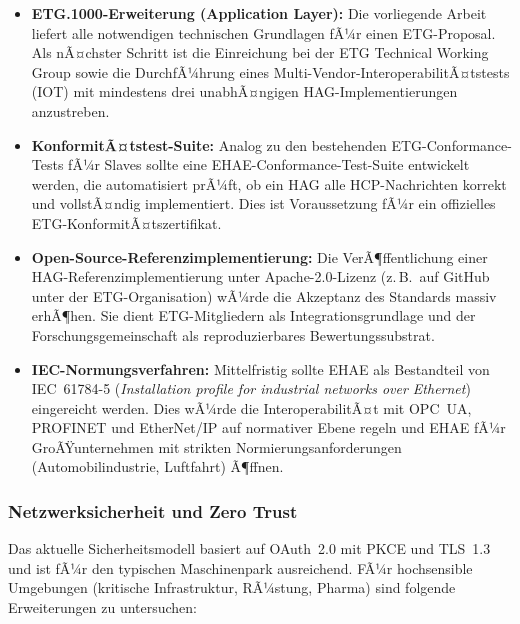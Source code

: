 ﻿\documentclass[12pt,a4paper]{article}
\begin{document}
\begin{itemize}[leftmargin=2em]
  \item \textbf{ETG.1000-Erweiterung (Application Layer):} Die vorliegende
    Arbeit liefert alle notwendigen technischen Grundlagen fÃ¼r einen
    ETG-Proposal. Als nÃ¤chster Schritt ist die Einreichung bei der ETG
    Technical Working Group sowie die DurchfÃ¼hrung eines
    Multi-Vendor-InteroperabilitÃ¤tstests (IOT) mit mindestens drei
    unabhÃ¤ngigen HAG-Implementierungen anzustreben.
  \item \textbf{KonformitÃ¤tstest-Suite:} Analog zu den bestehenden
    ETG-Conformance-Tests fÃ¼r Slaves sollte eine EHAE-Conformance-Test-Suite
    entwickelt werden, die automatisiert prÃ¼ft, ob ein HAG alle HCP-Nachrichten
    korrekt und vollstÃ¤ndig implementiert. Dies ist Voraussetzung fÃ¼r ein
    offizielles ETG-KonformitÃ¤tszertifikat.
  \item \textbf{Open-Source-Referenzimplementierung:} Die VerÃ¶ffentlichung
    einer HAG-Refe\-renzimplementierung unter Apache-2.0-Lizenz (z.\,B.\ auf
    GitHub unter der ETG-Organisation) wÃ¼rde die Akzeptanz des Standards
    massiv erhÃ¶hen. Sie dient ETG-Mitgliedern als Integrationsgrundlage und
    der Forschungsgemeinschaft als reproduzierbares Bewertungssubstrat.
  \item \textbf{IEC-Normungsverfahren:} Mittelfristig sollte EHAE als
    Bestandteil von IEC~61784-5 (\emph{Installation profile for industrial
    networks over Ethernet}) eingereicht werden. Dies wÃ¼rde die
    InteroperabilitÃ¤t mit OPC~UA, PROFINET und EtherNet/IP auf normativer
    Ebene regeln und EHAE fÃ¼r GroÃŸunternehmen mit strikten
    Normierungsanforderungen (Automobilindustrie, Luftfahrt) Ã¶ffnen.
\end{itemize}

\subsubsection*{Netzwerksicherheit und Zero Trust}

Das aktuelle Sicherheitsmodell basiert auf OAuth~2.0 mit PKCE und TLS~1.3 und
ist fÃ¼r den typischen Maschinenpark ausreichend. FÃ¼r hochsensible Umgebungen
(kritische Infrastruktur, RÃ¼stung, Pharma) sind folgende Erweiterungen zu
untersuchen:
\end{document}
